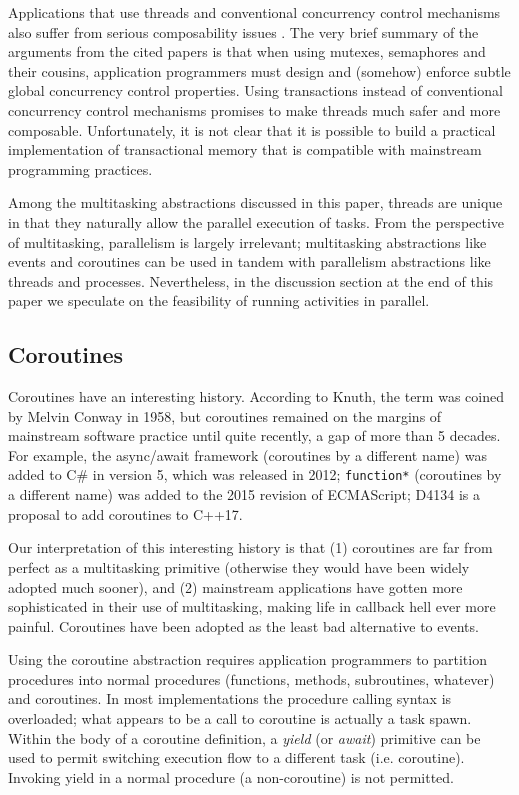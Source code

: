 \documentclass[10pt,preprint]{sigplanconf}
\begin{document}
Applications that use threads and conventional concurrency control mechanisms also suffer from serious composability issues \cite{Harris2005, Grossman2007}.
The very brief summary of the arguments from the cited papers is that when using mutexes, semaphores and their cousins, application programmers must design and (somehow) enforce subtle global concurrency control properties.
Using transactions instead of conventional concurrency control mechanisms promises to make threads much safer and more composable.
Unfortunately, it is not clear that it is possible to build a practical implementation of transactional memory that is compatible with mainstream programming practices.

Among the multitasking abstractions discussed in this paper, threads are unique in that they naturally allow the parallel execution of tasks.
From the perspective of multitasking, parallelism is largely irrelevant; multitasking abstractions like events and coroutines can be used in tandem with parallelism abstractions like threads and processes.
Nevertheless, in the discussion section at the end of this paper we speculate on the feasibility of running activities in parallel.

\subsection{Coroutines}

Coroutines have an interesting history.
According to Knuth, the term was coined by Melvin Conway in 1958, but coroutines remained on the margins of mainstream software practice until quite recently, a gap of more than 5 decades.
For example, the async/await framework (coroutines by a different name) was added to C\# in version 5, which was released in 2012; \texttt{function*} (coroutines by a different name) was added to the 2015 revision of ECMAScript; D4134 is a proposal to add coroutines to C++17.

Our interpretation of this interesting history is that (1) coroutines are far from perfect as a multitasking primitive (otherwise they would have been widely adopted much sooner), and (2) mainstream applications have gotten more sophisticated in their use of multitasking, making life in callback hell ever more painful.
Coroutines have been adopted as the least bad alternative to events.

Using the coroutine abstraction requires application programmers to partition procedures into normal procedures (functions, methods, subroutines, whatever) and coroutines.
In most implementations the procedure calling syntax is overloaded; what appears to be a call to coroutine is actually a task spawn.
Within the body of a coroutine definition, a \emph{yield} (or \emph{await}) primitive can be used to permit switching execution flow to a different task (i.e. coroutine).
Invoking yield in a normal procedure (a non-coroutine) is not permitted.
\end{document}
